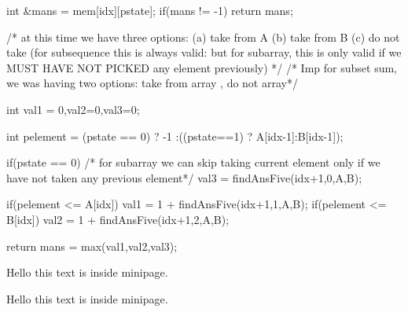 \begin{solution}
\begin{code3}
{        int &mans = mem[idx][pstate];
        if(mans != -1) return mans;
        
        /* at this time we have three options:
            (a) take from A
            (b) take from B
            (c) do not take (for subsequence this is always valid: but for subarray, this is only valid if we MUST HAVE  NOT PICKED any element previously)
        */
        /* Imp for subset sum, we was having two options: take from array , do not array*/
        
        int val1 = 0,val2=0,val3=0;
        
        int pelement = (pstate == 0) ? -1 :((pstate==1) ? A[idx-1]:B[idx-1]);
        
            if(pstate == 0) /* for subarray we can skip taking current element only if we have not taken any previous element*/
            val3 = findAnsFive(idx+1,0,A,B);
        
        if(pelement <= A[idx])
            val1 = 1 + findAnsFive(idx+1,1,A,B);
        if(pelement <= B[idx])
            val2 = 1 + findAnsFive(idx+1,2,A,B);
        
        
        
        return mans = max({val1,val2,val3});
    }
    \end{code3}

    \begin{minipage}{\textwidth}
        Hello this text is inside minipage.
    \end{minipage}
    
    \begin{minipage}{\linewidth}
        Hello this text is inside minipage.
    \end{minipage}


\end{solution}